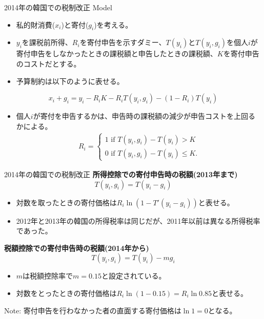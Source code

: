 \documentclass[dvipdfmx,10pt]{beamer}
\begin{document}
	\begin{frame}{2014年の韓国での税制改正}
		\protect\hypertarget{tax-reform-in-south-korea-2}{}
		Model
		\begin{itemize}
			\item 私的財消費(\(x_{i}\))と寄付(\(g_{i}\))を考える。
			\item \(y_{i}\)を課税前所得、\(R_{i}\)を寄付申告を示すダミー、\(T(y_i)\)と\(T(y_{i}, g_{i})\)を個人$i$が寄付申告をしなかったときの課税額と申告したときの課税額、$K$を寄付申告のコストだとする。
			\item 予算制約は以下のように表せる。
		\end{itemize}
		
		\[x_{i} + g_{i} = y_{i} - R_iK- R_iT(y_{i}, g_{i})-(1-R_i)T(y_i)\]
		
		
		\begin{itemize}
			\item 個人$i$が寄付を申告するかは、申告時の課税額の減少が申告コストを上回るかによる。
			\begin{align}
				R_i=\begin{cases}
					1 \text{ if }T(y_i, g_i) - T(y_i)>K\\
					0 \text{ if }T(y_i, g_i) - T(y_i)\le K.
				\end{cases}
			\end{align}
		\end{itemize}
	\end{frame}
	
	\begin{frame}{2014年の韓国での税制改正}
		\textbf{所得控除での寄付申告時の税額(2013年まで)}
		\[T(y_{i}, g_{i}) = T(y_{i} - g_{i})\]
		
		\begin{itemize}
			\item 対数を取ったときの寄付価格は\(R_{i}\ln(1 - T'(y_{i} - g_{i}))\)と表せる。
			\item 2012年と2013年の韓国の所得税率は同じだが、2011年以前は異なる所得税率であった。
		\end{itemize}
		
		\textbf{税額控除での寄付申告時の税額(2014年から)}
		\[T(y_{i}, g_{i}) = T(y_{i}) - m g_{i}\]
		
		\begin{itemize}
			\item \(m\)は税額控除率で\(m = 0.15\)と設定されている。
			\item 対数をとったときの寄付価格は\(R_{i}\ln(1 - 0.15) = R_{i}\ln 0.85\)と表せる。
		\end{itemize}
		
		Note: 寄付申告を行わなかった者の直面する寄付価格は\(\ln1 =0\)となる。
	\end{frame}
	
\end{document}
